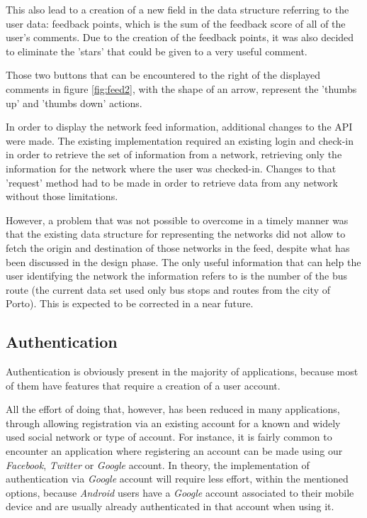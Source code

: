 This also lead to a creation of a new field in the data structure referring to the user data: feedback points, which is the sum of the feedback score of all of the user's comments. Due to the creation of the feedback points, it was also decided to eliminate the 'stars' that could be given to a very useful comment.

Those two buttons that can be encountered to the right of the displayed comments in figure \ref{fig:feed2}, with the shape of an arrow, represent the 'thumbs up' and 'thumbs down' actions.

In order to display the network feed information, additional changes to the API were made. The existing implementation required an existing login and check-in in order to retrieve the set of information from a network, retrieving only the information for the network where the user was checked-in. Changes to that 'request' method had to be made in order to retrieve data from any network without those limitations.

However, a problem that was not possible to overcome in a timely manner was that the existing data structure for representing the networks did not allow to fetch the origin and destination of those networks in the feed, despite what has been discussed in the design phase. The only useful information that can help the user identifying the network the information refers to is the number of the bus route (the current data set used only bus stops and routes from the city of Porto). This is expected to be corrected in a near future.

\subsection{Authentication}\label{authentication}

Authentication is obviously present in the majority of applications, because most of them have features that require a creation of a user account.

All the effort of doing that, however, has been reduced in many applications, through allowing registration via an existing account for a known and widely used social network or type of account. For instance, it is fairly common to encounter an application where registering an account can be made using our \emph{Facebook}, \emph{Twitter} or \emph{Google} account. In theory, the implementation of authentication via \emph{Google} account will require less effort, within the mentioned options, because \emph{Android} users have a \emph{Google} account associated to their mobile device and are usually already authenticated in that account when using it.

